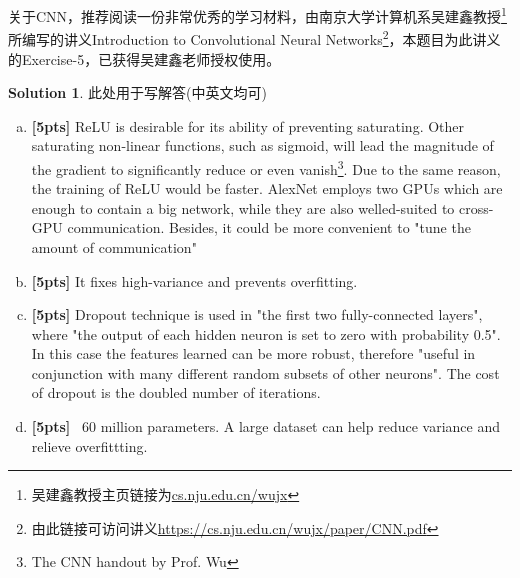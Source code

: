 \documentclass[a4paper,UTF8]{article}
\numberwithin{equation}{section}
\theoremstyle{definition}
\newtheorem*{solution}{Solution}
\begin{document}
关于CNN，推荐阅读一份非常优秀的学习材料，由南京大学计算机系吴建鑫教授\footnote{吴建鑫教授主页链接为\url{cs.nju.edu.cn/wujx}}所编写的讲义Introduction to Convolutional Neural Networks\footnote{由此链接可访问讲义\url{https://cs.nju.edu.cn/wujx/paper/CNN.pdf}}，本题目为此讲义的Exercise-5，已获得吴建鑫老师授权使用。
\begin{solution}
此处用于写解答(中英文均可)
\begin{enumerate}[(a)]
\item \textbf{[5pts]} ReLU is desirable for its ability of preventing saturating. Other saturating non-linear functions, such as sigmoid,  will lead the magnitude of the gradient to significantly reduce or even vanish\footnote{The CNN handout by Prof. Wu}. Due to the same reason, the training of ReLU would be faster. AlexNet employs two GPUs which are enough to contain a big network, while they are also welled-suited to cross-GPU communication. Besides, it could be more convenient to "tune the amount of communication"
\item \textbf{[5pts]} It fixes high-variance and prevents overfitting.
\item \textbf{[5pts]} Dropout technique is used in "the first two fully-connected layers", where "the output of each hidden neuron is set to zero with probability 0.5". In this case the features learned can be more robust, therefore "useful in conjunction with many different random subsets of other neurons". The cost of dropout is the doubled number of iterations.
\item \textbf{[5pts]} ~60 million parameters. A large dataset can help reduce variance and relieve overfittting.
\end{enumerate}

\end{solution}
\end{document}
